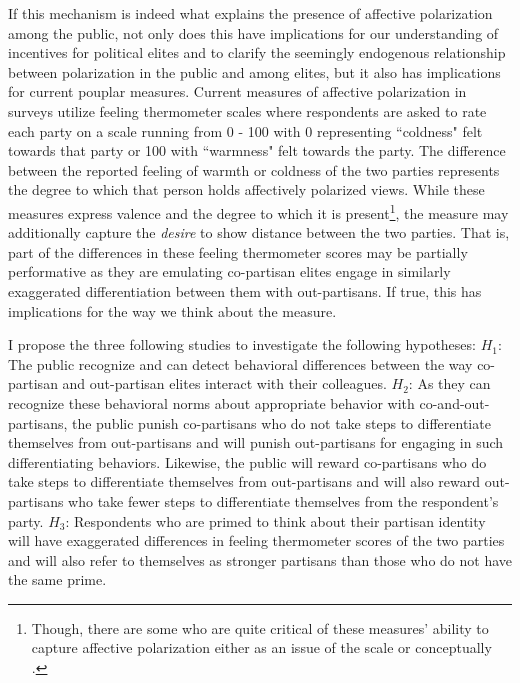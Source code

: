 \documentclass[12pt]{article}
\begin{document}
If this mechanism is indeed what explains the presence of affective polarization among the public, not only does this have implications for our understanding of incentives for political elites and to clarify the seemingly endogenous relationship between polarization in the public and among elites, but it also has implications for current pouplar measures. Current measures of affective polarization in surveys utilize feeling thermometer scales where respondents are asked to rate each party on a scale running from 0 - 100 with 0 representing ``coldness" felt towards that party or 100 with ``warmness" felt towards the party. The difference between the reported feeling of warmth or coldness of the two parties represents the degree to which that person holds affectively polarized views. While these measures express valence and the degree to which it is present\footnote{Though, there are some who are quite critical of these measures' ability to capture affective polarization either as an issue of the scale or conceptually \citep[see][]{druckman_levendusky_2019}.}, the measure may additionally capture the \textit{desire} to show distance between the two parties. That is, part of the differences in these feeling thermometer scores may be partially performative as they are emulating co-partisan elites engage in similarly exaggerated differentiation between them with out-partisans. If true, this has implications for the way we think about the measure.

I propose the three following studies to investigate the following hypotheses: \textbf{$H_1$}: The public recognize and can detect behavioral differences between the way co-partisan and out-partisan elites interact with their colleagues.
\textbf{$H_2$}: As they can recognize these behavioral norms about appropriate behavior with co-and-out-partisans, the public punish co-partisans who do not take steps to differentiate themselves from out-partisans and will punish out-partisans for engaging in such differentiating behaviors. Likewise, the public will reward co-partisans who do take steps to differentiate themselves from out-partisans and will also reward out-partisans who take fewer steps to differentiate themselves from the respondent's party.
\textbf{$H_3$}: Respondents who are primed to think about their partisan identity will have exaggerated differences in feeling thermometer scores of the two parties and will also refer to themselves as stronger partisans than those who do not have the same prime. 
\end{document}
